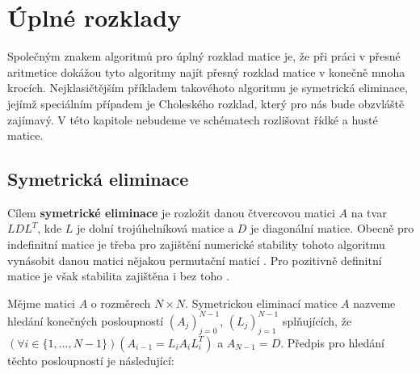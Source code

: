 \documentclass[11pt,american,czech,oneside]{book}
\theoremstyle{plain}
\theoremstyle{definition}
\begin{document}
\section{Úplné rozklady}

Společným znakem algoritmů pro úplný rozklad matice je, že při práci v přesné aritmetice dokážou tyto algoritmy najít přesný rozklad matice v konečně mnoha krocích. Nejklasičtějším příkladem takovéhoto algoritmu je symetrická eliminace, jejímž speciálním případem je Choleského rozklad, který pro nás bude obzvláště zajímavý. V této kapitole nebudeme ve schématech rozlišovat řídké a husté matice.

\subsection{Symetrická eliminace}

Cílem \textbf{symetrické eliminace} je rozložit danou čtvercovou matici $A$ na tvar $LDL^T$, kde $L$ je dolní trojúhelníková matice a $D$ je diagonální matice. Obecně pro indefinitní matice je třeba pro zajištění numerické stability tohoto algoritmu vynásobit danou matici nějakou permutační maticí \cite{fomo:67}. Pro pozitivně definitní matice je však stabilita zajištěna i bez toho \cite{wil:68}.

Mějme matici $A$ o rozměrech $N \times N$. Symetrickou eliminací matice $A$ nazveme hledání konečných posloupností $(A_j)_{j=0}^{N-1}$, $(L_j)_{j=1}^{N-1}$ splňujících, že $\left(\forall i \in \{1,...,N-1\}\right)\left(A_{i-1}=L_i A_i L_i^T \right)$ a $A_{N-1}=D$.
Předpis pro hledání těchto posloupností je následující:
\end{document}
